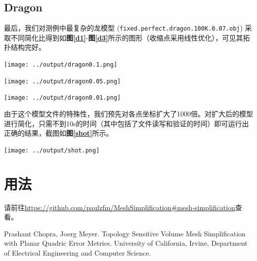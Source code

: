 \documentclass[11pt, a4paper]{article}
\makeatletter
\newcommand\fcaption{\def\@captype{figure}\caption}
\newcommand{\fref}[1]{\textbf{图\ref{#1}}}
\makeatother
\begin{document}
\subsection{Dragon}

最后，我们对测例中最复杂的龙模型 (\texttt{fixed.perfect.dragon.100K.0.07.obj}) 采取不同简化比得到如\fref{d1}-\fref{d3}所示的图形（收缩点采用线性优化），可见其拓扑结构完好。

\begin{center}
    \texttt{[image: ../output/dragon0.1.png]}
    \fcaption{简化比0.1}\label{d1}
\end{center}

\begin{center}
    \texttt{[image: ../output/dragon0.05.png]}
    \fcaption{简化比0.05}\label{d2}
\end{center}

\begin{center}
    \texttt{[image: ../output/dragon0.01.png]}
    \fcaption{简化比0.01}\label{d3}
\end{center}

由于这个模型文件的特殊性，我们预先对各点坐标扩大了1000倍。对扩大后的模型进行简化，只需不到10s的时间（其中包括了文件读写和验证的时间）即可运行出正确的结果，截图如\fref{shot}所示。

\begin{center}
    \texttt{[image: ../output/shot.png]}
    \fcaption{运行截图}\label{shot}
\end{center}

\section{用法}

请前往\url{https://github.com/paulzfm/MeshSimplification#mesh-simplification}查看。

\begin{thebibliography}{99}
     Prashant Chopra, Joerg Meyer. Topology Sensitive Volume Mesh Simplification with Planar Quadric Error Metrics. University of California, Irvine, Department of Electrical Engineering and Computer Science.
\end{thebibliography}
\end{document}
